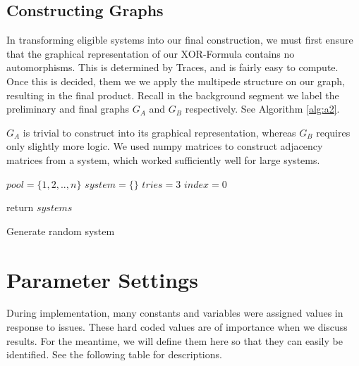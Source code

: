 \subsection{Constructing Graphs}
In transforming eligible systems into our final construction, we must first ensure that the graphical representation of our XOR-Formula contains no automorphisms. This is determined by Traces, and is fairly easy to compute. Once this is decided, them we we apply the multipede structure on our graph, resulting in the final product. Recall in the background segment we label the preliminary and final graphs $G_A$ and $G_B$ respectively. See Algorithm \ref{alg:a2}.
\par
$G_A$ is trivial to construct into its graphical representation, whereas $G_B$ requires only slightly more logic. We used numpy matrices to construct adjacency matrices from a system, which worked sufficiently well for large systems. 
\begin{algorithm}[htbp!]
		\SetAlgoNoLine
		$pool = \{1,2,..,n\}$\;
		$system=\{\}$\;
		$tries=3$\;
		$index=0$\;
		
	
	return $systems$
	\caption{Generate random system}
	\label{alg:a2}
\end{algorithm}



\newpage
\section{Parameter Settings}
During implementation, many constants and variables were assigned values in response to issues. These hard coded values are of importance when we discuss results. For the meantime, we will define them here so that they can easily be identified. See the following table for descriptions.

